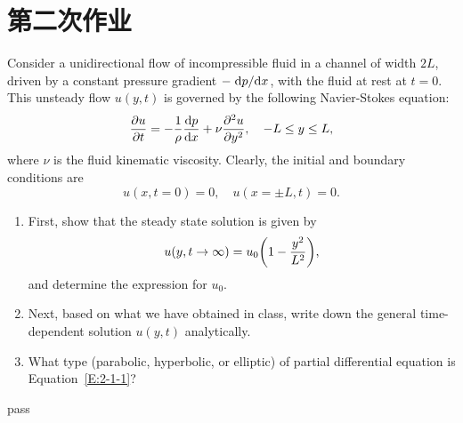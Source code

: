 \section{第二次作业}

\begin{homework}[label={H:2-1}]
    Consider a unidirectional flow of incompressible fluid in a channel of width $2L$, driven by a constant pressure gradient $-\dv*{p}{x}$, with the fluid at rest at $t=0$. This unsteady flow $u(y, t)$ is governed by the following Navier-Stokes equation:
    \begin{equation}\label{E:2-1-1}
        \pdv{u}{t} = -\frac{1}{\rho}\dv{p}{x} + \nu\pdv[2]{u}{y},
        \quad
        -L\leq y\leq L,
    \end{equation}
    where $\nu$ is the fluid kinematic viscosity. Clearly, the initial and boundary conditions are
    \begin{equation}\label{E:2-1-2}
        u(x, t=0) = 0,
        \quad
        u(x=\pm L, t) = 0.
    \end{equation}

    \begin{enumerate}[label=(\alph*)]
        \item First, show that the steady state solution is given by
            \begin{equation}\label{E:2-1-3}
                u(y, t\to\infty) = u_0\qty(1-\frac{y^2}{L^2}),
            \end{equation}
            and determine the expression for $u_0$.
        \item Next, based on what we have obtained in class, write down the general time-dependent solution $u(y, t)$ analytically.
        \item What type (parabolic, hyperbolic, or elliptic) of partial differential equation is Equation~\eqref{E:2-1-1}?
    \end{enumerate}
\end{homework}

pass



